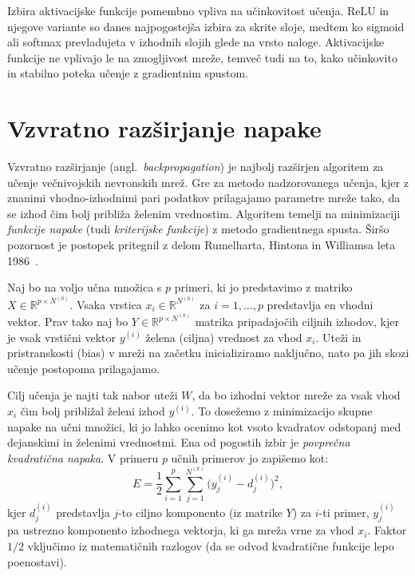 Izbira aktivacijske funkcije pomembno vpliva na učinkovitost učenja. ReLU in njegove variante so danes najpogostejša izbira za skrite sloje, medtem ko sigmoid ali softmax prevladujeta v izhodnih slojih glede na vrsto naloge. Aktivacijske funkcije ne vplivajo le na zmogljivost mreže, temveč tudi na to, kako učinkovito in stabilno poteka učenje z gradientnim spustom.



\section{Vzvratno razširjanje napake}

Vzvratno razširjanje (angl.~\textit{backpropagation}) je najbolj razširjen algoritem za učenje večnivojskih nevronskih mrež. Gre za metodo nadzorovanega učenja, kjer z znanimi vhodno-izhodnimi pari podatkov prilagajamo parametre mreže tako, da se izhod čim bolj približa želenim vrednostim. Algoritem temelji na minimizaciji \textit{funkcije napake} (tudi \textit{kriterijske funkcije}) z metodo gradientnega spusta. Širšo pozornost je postopek pritegnil z delom Rumelharta, Hintona in Williamsa leta 1986~\cite{Rumelhart1986}.

Naj bo na voljo učna množica s $p$ primeri, ki jo predstavimo z matriko $X \in \mathbb{R}^{p \times N^{(0)}}$. Vsaka vrstica $x_i \in \mathbb{R}^{N^{(0)}}$ za $i = 1, \dots, p$ predstavlja en vhodni vektor. Prav tako naj bo $Y \in \mathbb{R}^{p \times N^{(k)}}$ matrika pripadajočih ciljnih izhodov, kjer je vsak vrstični vektor $y^{(i)}$ želena (ciljna) vrednost za vhod $x_i$. Uteži in pristranskosti (bias) v mreži na začetku inicializiramo naključno, nato pa jih skozi učenje postopoma prilagajamo.

Cilj učenja je najti tak nabor uteži $W$, da bo izhodni vektor mreže za vsak vhod $x_i$ čim bolj približal želeni izhod $y^{(i)}$. To dosežemo z minimizacijo skupne napake na učni množici, ki jo lahko ocenimo kot vsoto kvadratov odstopanj med dejanskimi in želenimi vrednostmi. Ena od pogostih izbir je \textit{povprečna kvadratična napaka}. V primeru $p$ učnih primerov jo zapišemo kot:
\[
E = \frac{1}{2} \sum_{i=1}^{p} \sum_{j=1}^{N^{(k)}} \big(y_{j}^{(i)} - d_{j}^{(i)}\big)^2,
\] 
kjer $d_{j}^{(i)}$ predstavlja $j$-to ciljno komponento (iz matrike $Y$) za $i$-ti primer, $y_{j}^{(i)}$ pa ustrezno komponento izhodnega vektorja, ki ga mreža vrne za vhod $x_i$. Faktor $1/2$ vključimo iz matematičnih razlogov (da se odvod kvadratične funkcije lepo poenostavi).

